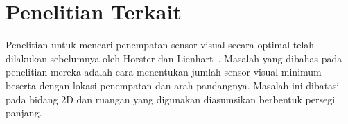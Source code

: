 %
%
%
%
%
%
%

\section{Penelitian Terkait}
\label{penelitian_horster}
Penelitian untuk mencari penempatan sensor visual secara optimal telah dilakukan sebelumnya oleh Horster dan Lienhart~\cite{horster2006approximating}. Masalah yang dibahas pada penelitian mereka adalah cara menentukan jumlah sensor visual minimum beserta dengan lokasi penempatan dan arah pandangnya. Masalah ini dibatasi pada bidang 2D dan ruangan yang digunakan diasumsikan berbentuk persegi panjang.

